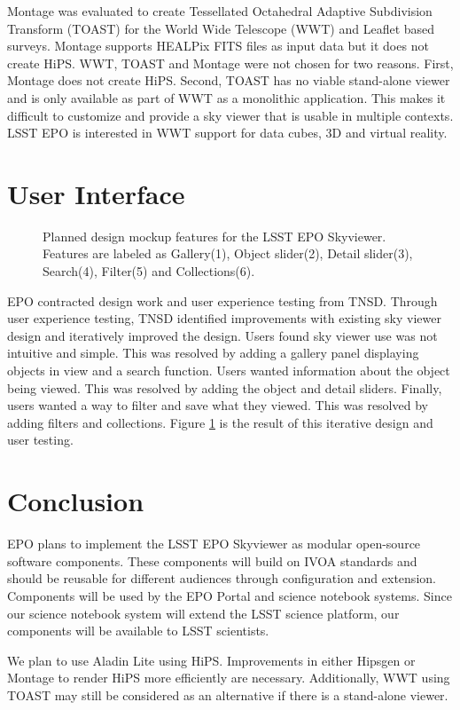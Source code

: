\documentclass[11pt,twoside]{article}
\begin{document}
Montage \citep{2017PASP..129e8006B} was evaluated to create Tessellated Octahedral Adaptive Subdivision Transform (TOAST) for the World Wide Telescope (WWT) \citep{2012ASPC..461..267G} and Leaflet based surveys. Montage supports HEALPix FITS files as input data but it does not create HiPS. WWT, TOAST and Montage were not chosen for two reasons. First, Montage does not create HiPS. Second, TOAST has no viable stand-alone viewer and is only available as part of WWT as a monolithic application. This makes it difficult to customize and provide a sky viewer that is usable in multiple contexts. LSST EPO is interested in WWT support for data cubes, 3D and virtual reality.
\section{User Interface}
\begin{figure}[!ht]
  \caption{Planned design mockup features for the LSST EPO Skyviewer. Features are labeled as Gallery(1), Object slider(2), Detail slider(3), Search(4), Filter(5) and Collections(6).}
  \label{P3-140_fig1}
\end{figure}
\noindent EPO contracted design work and user experience testing from TNSD. Through user experience testing, TNSD identified improvements with existing sky viewer design and iteratively improved the design. Users found sky viewer use was not intuitive and simple. This was resolved by adding a gallery panel displaying objects in view and a search function. Users wanted information about the object being viewed. This was resolved by adding the object and detail sliders. Finally, users wanted a way to filter and save what they viewed. This was resolved by adding filters and collections. Figure \ref{P3-140_fig1} is the result of this iterative design and user testing.

\section{Conclusion}
EPO plans to implement the LSST EPO Skyviewer as modular open-source software components. These components will build on IVOA standards and should be reusable for different audiences through configuration and extension. Components will be used by the EPO Portal and science notebook systems. Since our science notebook system will extend the LSST science platform, our components will be available to LSST scientists.

We plan to use Aladin Lite using HiPS. Improvements in either Hipsgen or Montage to render HiPS more efficiently are necessary. Additionally, WWT using TOAST may still be considered as an alternative if there is a stand-alone viewer.
\end{document}
